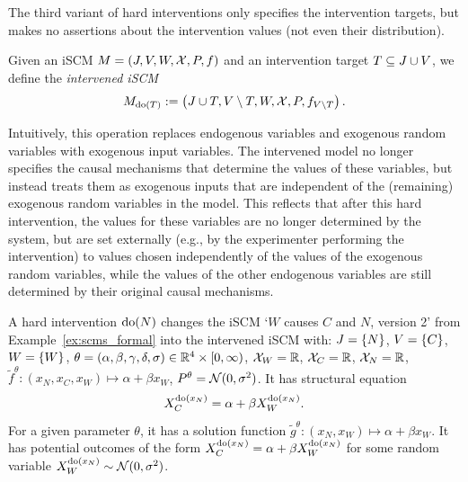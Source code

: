The third variant of hard interventions only specifies the intervention targets, but makes
no assertions about the intervention values (not even their distribution).
\begin{Def}\label{def:scm_hard_intervention_unspecified}
  Given an iSCM $M = \left ( J, V, W, \mathcal{X}, P, f \right )$
  and an intervention target $T \subseteq J \cup V$, %
  we define the \emph{intervened iSCM}
   $$M_{\operatorname{do}(T)} := \left ( J \cup T,V \setminus T,W,\mathcal{X},P,f_{V\setminus T} \right ).$$
\end{Def}
Intuitively, this operation replaces endogenous variables and exogenous random variables with exogenous input variables.
The intervened model no longer specifies the causal mechanisms that determine the values of these variables, 
but instead treats them as exogenous inputs that are independent of the (remaining) exogenous random variables in the model. 
This reflects that after this hard intervention, the values for
these variables are no longer determined by the system, but are set externally (e.g., by the 
experimenter performing the intervention) to values chosen independently of the values of the exogenous
random variables, while the values of the other endogenous variables are still
determined by their original causal mechanisms.
\begin{Eg}
  A hard intervention $\operatorname{do}(N)$ changes the iSCM `$W$ causes $C$ and $N$, version 2' from Example~\ref{ex:scms_formal} 
  into the intervened iSCM with:
  $J = \{N\}$, $V = \{C\}$, $W = \{W\}$, $\theta = (\alpha,\beta,\gamma,\delta,\sigma) \in \mathbb{R}^4 \times [0,\infty)$, 
  $\mathcal{X}_W = \mathbb{R}$, $\mathcal{X}_C = \mathbb{R}$, $\mathcal{X}_N = \mathbb{R}$, $\tilde{f}^\theta : (x_N, x_C, x_W) \mapsto \alpha + \beta x_W$, $P^\theta = \mathcal{N}(0,\sigma^2)$.
  It has structural equation
  $$X_C^{\operatorname{do}(x_N)} = \alpha + \beta X_W^{\operatorname{do}(x_N)}.$$
  For a given parameter $\theta$, it has a solution function $\tilde{g}^\theta : (x_N, x_W) \mapsto \alpha + \beta x_W$. 
  It has potential outcomes of the form $X_C^{\operatorname{do}(x_N)} = \alpha + \beta X^{\operatorname{do}(x_N)}_W$ for some random variable $X_W^{\operatorname{do}(x_N)} \sim \mathcal{N}(0,\sigma^2)$. 
\end{Eg}

